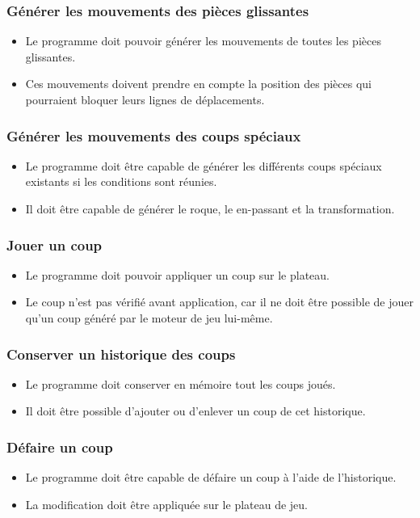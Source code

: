 \huge\documentclass{article}
\begin{document}
\subsubsection{Générer les mouvements des pièces glissantes}
\begin{itemize}
    \item Le programme doit pouvoir générer les mouvements de toutes les pièces glissantes.
    \item Ces mouvements doivent prendre en compte la position des pièces qui pourraient bloquer leurs lignes de déplacements.
\end{itemize}
\medskip
\subsubsection{Générer les mouvements des coups spéciaux}
\begin{itemize}
    \item Le programme doit être capable de générer les différents coups spéciaux existants si les conditions sont réunies.
    \item Il doit être capable de générer le roque, le en-passant et la transformation.
\end{itemize}
\medskip
\subsubsection{Jouer un coup}
\begin{itemize}
    \item Le programme doit pouvoir appliquer un coup sur le plateau.
    \item Le coup n'est pas vérifié avant application, car il ne doit être possible de jouer qu'un coup généré par le moteur de jeu lui-même.
\end{itemize}

\medskip
\subsubsection{Conserver un historique des coups}
\begin{itemize}
    \item Le programme doit conserver en mémoire tout les coups joués.
    \item Il doit être possible d'ajouter ou d'enlever un coup de cet historique.
\end{itemize}
\medskip
\subsubsection{Défaire un coup}
\begin{itemize}
    \item Le programme doit être capable de défaire un coup à l'aide de l'historique.
    \item La modification doit être appliquée sur le plateau de jeu.
\end{itemize}
\medskip
\end{document}
